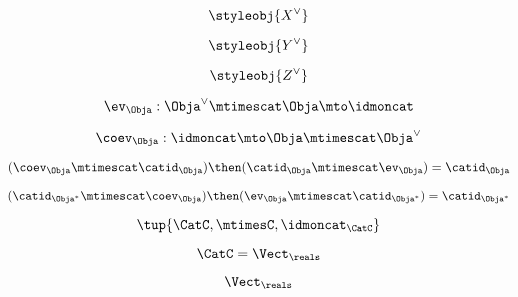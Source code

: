 {\begin{forslides}
\begin{equation}\label{eq:slides-parallelism-14}
\styleobj{X^\vee}
\end{equation}

\begin{equation}\label{eq:slides-parallelism-15}
\styleobj{Y^\vee}
\end{equation}

\begin{equation}\label{eq:slides-parallelism-16}
\styleobj{Z^\vee}
\end{equation}

\begin{equation}\label{eq:slides-parallelism-17}
\ev_\Obja: \Obja^\vee \mtimescat \Obja \mto \idmoncat
\end{equation}

\begin{equation}\label{eq:slides-parallelism-18}
\coev_\Obja: \idmoncat \mto \Obja \mtimescat \Obja^\vee
\end{equation}

\begin{equation}\label{eq:slides-parallelism-19}
(\coev_\Obja \mtimescat \catid_\Obja) \then (\catid_\Obja \mtimescat \ev_\Obja) = \catid_\Obja
\end{equation}

\begin{equation}\label{eq:slides-parallelism-20}
(\catid_{\Obja^*} \mtimescat \coev_\Obja)  \then (\ev_\Obja \mtimescat \catid_{\Obja^*})  = \catid_{\Obja^*}\end{equation}

\begin{equation}\label{eq:slides-parallelism-21}
\tup{\CatC,\mtimesC,\idmoncat_{\CatC}}
\end{equation}

\begin{equation}\label{eq:slides-parallelism-22}
\CatC = \Vect_{\reals}
\end{equation}

\begin{equation}\label{eq:slides-parallelism-23}
\Vect_{\reals}
\end{equation}



\end{forslides}
}